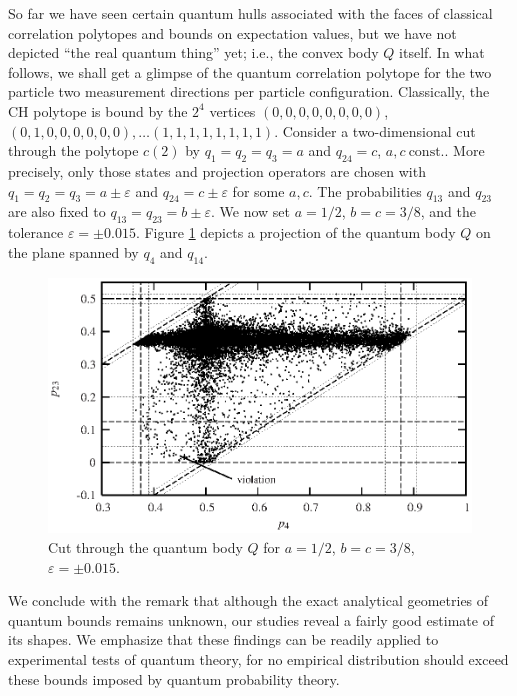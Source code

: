 So far we have seen certain quantum hulls associated with
the faces of classical correlation polytopes and bounds on expectation values,
but we have not depicted
``the real quantum thing'' yet; i.e., the convex body $Q$ itself.
In what follows, we shall get a glimpse of the quantum correlation polytope
for the two particle two measurement directions per particle configuration.
Classically, the CH polytope is bound by the $2^4$ vertices
$
(0,0,0,0,0,0,0,0)
$,
$
(0,1,0,0,0,0,0,0),
\ldots
(1,1,1,1,1,1,1,1)
$.
Consider a two-dimensional
cut through the polytope $c(2)$ by
$q_{1}=q_{2}=q_{3}=a$ and $q_{24}=c$, $a,c\ \mbox{const.}$.
More precisely, only those states and projection operators are chosen
with $q_{1}=q_{2}=q_{3}=a\pm\varepsilon$ and
$q_{24}=c\pm\varepsilon$ for some $a,c$. The probabilities $q_{13}$
and $q_{23}$ are also fixed to $q_{13}=q_{23}=b\pm\varepsilon$.
We now set $a=1/2$, $b=c=3/8$, and the tolerance $\varepsilon=\pm
0.015$. Figure \ref{f-2003-bell2hull}
depicts a projection of the quantum body $Q$ on
the plane spanned by $q_{4}$ and $q_{14}$.
\begin{figure}[htbp]
  \centering
  \includegraphics{2003-qpoly-bell2}
  \caption{Cut through the quantum body $Q$ for $a=1/2$, $b=c=3/8$, $\varepsilon=\pm 0.015$.}
  \label{f-2003-bell2hull}
\end{figure}


We conclude with the remark that
although the exact analytical
geometries of quantum bounds
remains unknown, our studies
reveal a fairly good estimate of its shapes.
We emphasize that these findings can be readily applied to experimental
tests of quantum theory, for no empirical
distribution should exceed these bounds imposed
by quantum probability theory.


%
%
%
%

